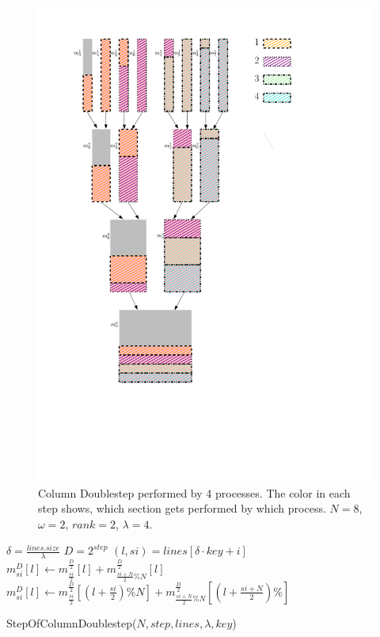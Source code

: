 \documentclass[12pt]{article}
\begin{document}
\begin{figure}[ht!]
	\includegraphics[height=\textheight-3cm]{processes_row_doublestep}
	\caption{Column Doublestep performed by 4 processes. The color in each step shows, which section gets performed by which process. $N=8$, $\omega = 2$, $rank=2$, $\lambda=4$.}
	\label{fig::colum_DS_distribution}
\end{figure}

\begin{algorithm} [H]
	\begin{algorithmic}[1]
		\State $\delta = \frac{lines.size}{\lambda}$
		\State $D=2^{step}$
				\State $(l,si) = lines[\delta\cdot key+i]$
					\State $m_{si}^{D}[l] \leftarrow m_{\frac{si}{2}}^\frac{D}{2}[l]+m_{\frac{si+N}{2}\%N}^\frac{D}{2}[l]$
				\Else
					\State $m_{si}^{D}[l] \leftarrow m_{\frac{si}{2}}^\frac{D}{2}[(l+\frac{si}{2})\%N]+m_{\frac{si+N}{2}\%N}^\frac{D}{2}[(l+\frac{si+N}{2})\%]$
				\EndIf
		\EndFor
	\end{algorithmic}
\caption{StepOfColumnDoublestep($N,step,lines,\lambda , key$)}
\label{code::DS_Per}
\end{algorithm}
\end{document}

